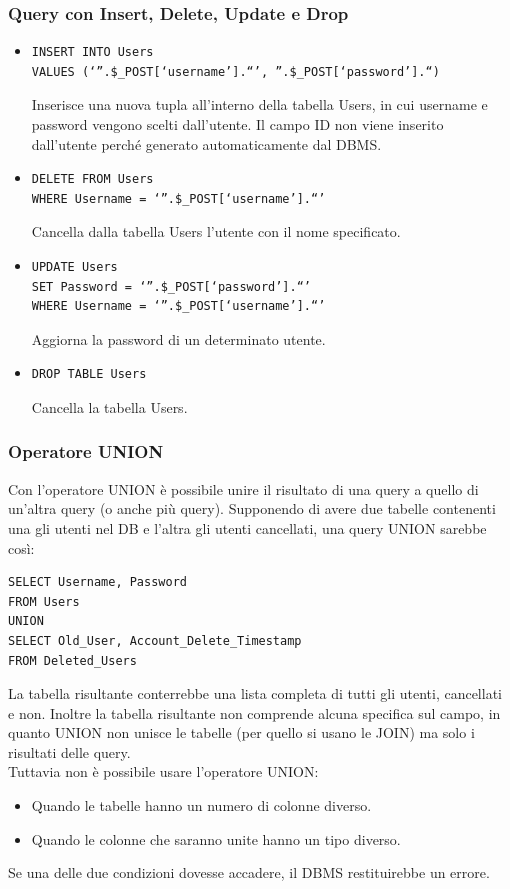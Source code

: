 \documentclass{article}
\begin{document}
\subsubsection{Query con Insert, Delete, Update e Drop}
\begin{itemize}
    \item \begin{verbatim}
INSERT INTO Users 
VALUES (‘”.$_POST[‘username’].“’, ”.$_POST[‘password’].“)
\end{verbatim}
    Inserisce una nuova tupla all’interno della tabella Users, in cui username e password vengono scelti dall’utente. Il campo ID non viene inserito dall’utente perché generato automaticamente dal DBMS.

    \item \begin{verbatim}
DELETE FROM Users 
WHERE Username = ‘”.$_POST[‘username’].“’ 
\end{verbatim}
    Cancella dalla tabella Users l’utente con il nome specificato.

    \item \begin{verbatim}
UPDATE Users 
SET Password = ‘”.$_POST[‘password’].“’ 
WHERE Username = ‘”.$_POST[‘username’].“’ 
\end{verbatim}
    Aggiorna la password di un determinato utente.
    
    \item \begin{verbatim}
DROP TABLE Users
\end{verbatim} 
    Cancella la tabella Users.
\end{itemize}

\subsubsection{Operatore UNION}
Con l'operatore UNION è possibile unire il risultato di una query a quello di un'altra query (o anche più query). Supponendo di avere due tabelle contenenti una gli utenti nel DB e l'altra gli utenti cancellati, una query UNION sarebbe così:
\begin{verbatim}
SELECT Username, Password 
FROM Users 
UNION
SELECT Old_User, Account_Delete_Timestamp 
FROM Deleted_Users
\end{verbatim}
La tabella risultante conterrebbe una lista completa di tutti gli utenti, cancellati e non. Inoltre la tabella risultante non comprende alcuna specifica sul campo, in quanto UNION non unisce le tabelle (per quello si usano le JOIN) ma solo i risultati delle query.\\
Tuttavia non è possibile usare l'operatore UNION:
\begin{itemize}
    \item Quando le tabelle hanno un numero di colonne diverso.
    \item Quando le colonne che saranno unite hanno un tipo diverso.
\end{itemize}
Se una delle due condizioni dovesse accadere, il DBMS restituirebbe un errore.
\end{document}
